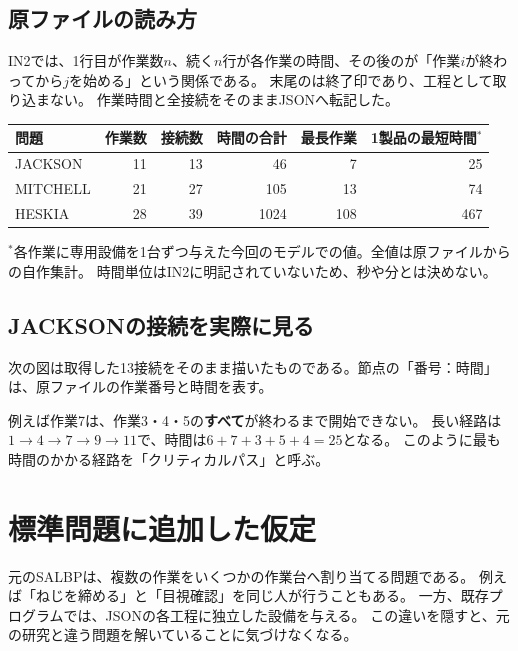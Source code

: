 \documentclass[a4paper,11pt]{ltjsarticle}
\DeclareRobustCommand{\code}[1]{\texttt{\detokenize{#1}}}
\begin{document}
\subsection{原ファイルの読み方}
IN2では、1行目が作業数$n$、続く$n$行が各作業の時間、その後の\code{i,j}が「作業$i$が終わってから$j$を始める」という関係である。
末尾の\code{-1,-1}は終了印であり、工程として取り込まない。
作業時間と全接続をそのままJSONへ転記した。

\begin{tabular}{lrrrrr}
\toprule 問題 & 作業数 & 接続数 & 時間の合計 & 最長作業 & 1製品の最短時間$^*$\\\midrule
JACKSON & 11 & 13 & 46 & 7 & 25\\
MITCHELL & 21 & 27 & 105 & 13 & 74\\
HESKIA & 28 & 39 & 1024 & 108 & 467\\
\bottomrule
\end{tabular}

{\small $^*$各作業に専用設備を1台ずつ与えた今回のモデルでの値。全値は原ファイルからの自作集計。
時間単位はIN2に明記されていないため、秒や分とは決めない。}

\subsection{JACKSONの接続を実際に見る}
次の図は取得した13接続をそのまま描いたものである。節点の「番号：時間」は、原ファイルの作業番号と時間を表す。

\begin{center}
\end{center}

例えば作業7は、作業3・4・5の\textbf{すべて}が終わるまで開始できない。
長い経路は$1\to4\to7\to9\to11$で、時間は$6+7+3+5+4=25$となる。
このように最も時間のかかる経路を「クリティカルパス」と呼ぶ。

\clearpage
\section{標準問題に追加した仮定}
元のSALBPは、複数の作業をいくつかの作業台へ割り当てる問題である\cite{salbp}。
例えば「ねじを締める」と「目視確認」を同じ人が行うこともある。
一方、既存プログラムでは、JSONの各工程に独立した設備を与える。
この違いを隠すと、元の研究と違う問題を解いていることに気づけなくなる。
\end{document}
